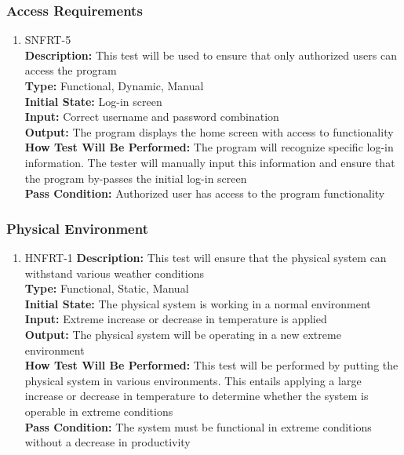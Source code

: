 \documentclass[12pt, titlepage]{article}
\begin{document}
\subsubsection{Access Requirements}
\begin{enumerate}
    \item{SNFRT-5\\}
    \textbf{Description:} This test will be used to ensure that only authorized users can access the program\\
    \textbf{Type:} Functional, Dynamic, Manual\\
    \textbf{Initial State:} Log-in screen\\
    \textbf{Input:} Correct username and password combination\\
    \textbf{Output:} The program displays the home screen with access to functionality\\
    \textbf{How Test Will Be Performed:} The program will recognize specific log-in information. The tester will manually input this information and ensure that the program by-passes the initial log-in screen\\
    \textbf{Pass Condition:} Authorized user has access to the program functionality\\
\end{enumerate}

\subsubsection{Physical Environment}
\begin{enumerate}
    \item{HNFRT-1}
    \textbf{Description:} This test will ensure that the physical system can withstand various weather conditions\\
    \textbf{Type:} Functional, Static, Manual\\
    \textbf{Initial State:} The physical system is working in a normal environment\\
    \textbf{Input:} Extreme increase or decrease in temperature is applied\\
    \textbf{Output:} The physical system will be operating in a new extreme environment\\
    \textbf{How Test Will Be Performed:} This test will be performed by putting the physical system in various environments. This entails applying a large increase or decrease in temperature to determine whether the system is operable in extreme conditions\\
    \textbf{Pass Condition:} The system must be functional in extreme conditions without a decrease in productivity\\
\end{enumerate}
\end{document}

